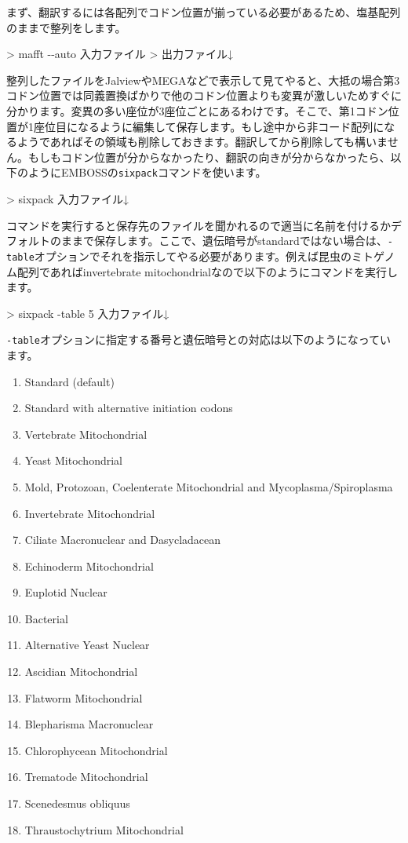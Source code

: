 \documentclass[titlepage,10pt,a4paper]{jsbook}
\newenvironment{cmd}{\begin{oframed}\raggedright\ttfamily\footnotesize\setlength{\baselineskip}{1.4em}}{\end{oframed}\vspace{-1em}}
\begin{document}
まず、翻訳するには各配列でコドン位置が揃っている必要があるため、塩基配列のままで整列をします。
\begin{cmd}
{\textgreater} mafft {-}{-}auto 入力ファイル > 出力ファイル↓
\end{cmd}
整列したファイルをJalviewやMEGAなどで表示して見てやると、大抵の場合第3コドン位置では同義置換ばかりで他のコドン位置よりも変異が激しいためすぐに分かります。変異の多い座位が3座位ごとにあるわけです。そこで、第1コドン位置が1座位目になるように編集して保存します。もし途中から非コード配列になるようであればその領域も削除しておきます。翻訳してから削除しても構いません。もしもコドン位置が分からなかったり、翻訳の向きが分からなかったら、以下のようにEMBOSSの\texttt{sixpack}コマンドを使います。
\begin{cmd}
{\textgreater} sixpack 入力ファイル↓
\end{cmd}
コマンドを実行すると保存先のファイルを聞かれるので適当に名前を付けるかデフォルトのままで保存します。ここで、遺伝暗号がstandardではない場合は、\texttt{-table}オプションでそれを指示してやる必要があります。例えば昆虫のミトゲノム配列であればinvertebrate mitochondrialなので以下のようにコマンドを実行します。
\begin{cmd}
{\textgreater} sixpack -table 5 入力ファイル↓
\end{cmd}
\texttt{-table}オプションに指定する番号と遺伝暗号との対応は以下のようになっています。
\begin{enumerate}\small\setlength{\baselineskip}{1.1em}
\addtocounter{enumi}{-1}%
\item Standard (default)
\item Standard with alternative initiation codons
\item Vertebrate Mitochondrial
\item Yeast Mitochondrial
\item Mold, Protozoan, Coelenterate Mitochondrial and Mycoplasma/Spiroplasma
\item Invertebrate Mitochondrial
\item Ciliate Macronuclear and Dasycladacean
\addtocounter{enumi}{2}%
\item Echinoderm Mitochondrial
\item Euplotid Nuclear
\item Bacterial
\item Alternative Yeast Nuclear
\item Ascidian Mitochondrial
\item Flatworm Mitochondrial
\item Blepharisma Macronuclear
\item Chlorophycean Mitochondrial
\addtocounter{enumi}{4}%
\item Trematode Mitochondrial
\item Scenedesmus obliquus
\item Thraustochytrium Mitochondrial
\end{enumerate}
\end{document}
